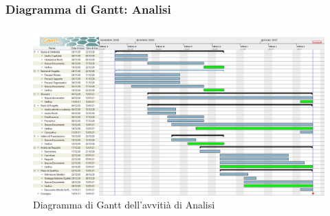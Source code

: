 \subsubsection{Diagramma di Gantt: Analisi}

\begin{figure}[ht]
    \centering
    \includegraphics[width=\textwidth]{../../Immagini/Analisi}
    \caption{Diagramma di Gantt dell'avvitià di Analisi}
\end{figure}
